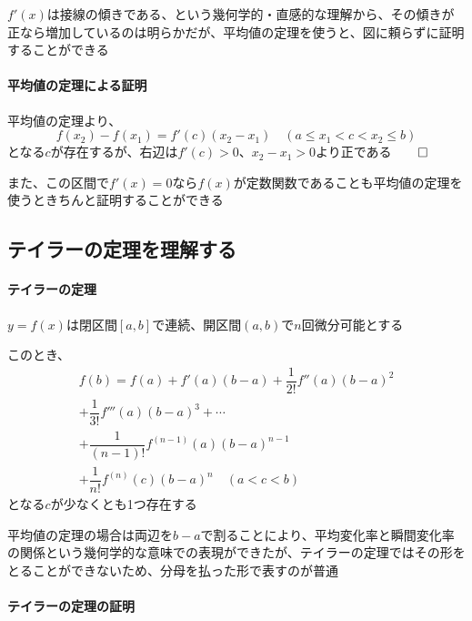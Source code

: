 \documentclass[../book_infinite_continuous_math]{subfiles}
\begin{document}
$f'(x)$は接線の傾きである、という幾何学的・直感的な理解から、その傾きが正なら増加しているのは明らかだが、平均値の定理を使うと、図に頼らずに証明することができる

\paragraph{平均値の定理による証明}\quad

平均値の定理より、
\begin{equation*}
  f(x_2) - f(x_1) = f'(c)(x_2 - x_1) \quad (a \leq x_1 < c < x_2 \leq b)
\end{equation*}
となる$c$が存在するが、右辺は$f'(c)>0$、$x_2 - x_1 > 0$より正である$\qed$

\sectionline

また、この区間で$f'(x) = 0$なら$f(x)$が定数関数であることも平均値の定理を使うときちんと証明することができる


\sectionline
\subsection{テイラーの定理を理解する}

\begin{oframed}
  \paragraph{テイラーの定理}
  $y=f(x)$は閉区間$[a, b]$で連続、開区間$(a, b)$で$n$回微分可能とする

  このとき、
  \begin{multline}
    f(b) = f(a) + f'(a)(b-a) + \dfrac{1}{2!}f''(a)(b-a)^2 \\+ \dfrac{1}{3!}f'''(a)(b-a)^3 + \cdots \\+ \dfrac{1}{(n-1)!}f^{(n-1)}(a)(b-a)^{n-1} \\+ \dfrac{1}{n!}f^{(n)}(c)(b-a)^n \quad (a< c < b)
  \end{multline}
  となる$c$が少なくとも1つ存在する
\end{oframed}

平均値の定理の場合は両辺を$b-a$で割ることにより、平均変化率と瞬間変化率の関係という幾何学的な意味での表現ができたが、テイラーの定理ではその形をとることができないため、分母を払った形で表すのが普通

\br

\paragraph{テイラーの定理の証明}\quad
\end{document}
